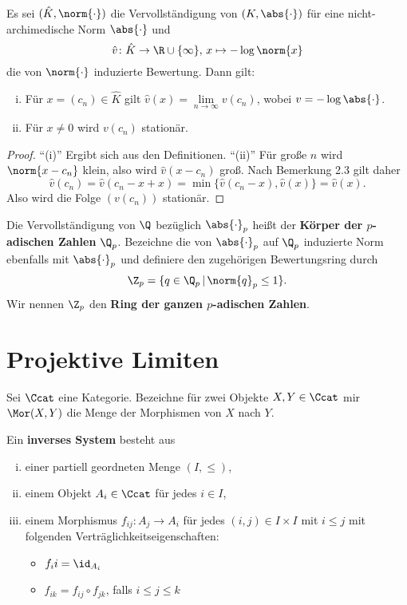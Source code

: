 \begin{Bem}
Es sei $(\hat{K}, \norm{\cdot})$ die Vervollständigung von $(K, \abs{\cdot})$ für eine nicht-archimedische Norm $\abs{\cdot}$ und 
\[ \hat{v} \colon \hat{K} \to \R\cup\{\infty \}, \, x \mapsto - \log \norm{x}
\]
die von $\norm{\cdot}$ induzierte Bewertung. Dann gilt:
\begin{enumerate}[(i)]
\item Für $x=(c_n) \in\hat{K}$ gilt $\hat{v}(x) = \lim\limits_{n\to\infty} v(c_n)$, wobei $v = - \log\abs{\cdot}$.
\item Für $x\neq 0$ wird $v(c_n)$ stationär.
\end{enumerate}
\end{Bem}

\begin{proof}
\enquote{(i)} Ergibt sich aus den Definitionen.
\enquote{(ii)} Für große $n$ wird $\norm{x-c_n}$ klein, also wird $\hat{v}(x-c_n)$ groß.
Nach Bemerkung 2.3 gilt daher
\[ \hat{v}(c_n) = \hat{v}(c_n-x+x) = \min \{ \hat{v}(c_n-x), \hat{v}(x) \} = \hat{v}(x).
\]
Also wird die Folge $(v(c_n))$ stationär.
\end{proof}


\begin{defi}
Die Vervollständigung von $\Q$ bezüglich $\abs{\cdot}_p$ heißt der \textbf{Körper der $p$-adischen Zahlen} $\Q_p$. Bezeichne die von $\abs{\cdot}_p$ auf $\Q_p$ induzierte Norm ebenfalls mit 
$\abs{\cdot}_p$ und definiere den zugehörigen Bewertungsring durch
\[ \Z_p = \{  q \in \Q_p \,|\, \norm{q}_p \leq 1 \}.
\]
Wir nennen $\Z_p$ den \textbf{Ring der ganzen $p$-adischen Zahlen}.
\end{defi}


\section{Projektive Limiten}
Sei $\Ccat$ eine Kategorie. Bezeichne für zwei Objekte $X, Y \in \Ccat$ mir $\Mor(X,Y)$ die Menge der Morphismen von $X$ nach $Y$.

\begin{defi}
Ein \textbf{inverses System} besteht aus
\begin{enumerate}[(i)]
\item einer partiell geordneten Menge $(I,\leq)$,
\item einem Objekt $A_i\in\Ccat$ für jedes $i\in I$,
\item einem Morphismus $f_{ij} \colon A_j \to A_i$ für jedes $(i,j) \in I \times I$ mit $i\leq j$ mit folgenden Verträglichkeitseigenschaften:
\begin{itemize}
\item $f_ii = \id_{A_i}$
\item $f_{ik} = f_{ij} \circ f_{jk}$, falls $i \leq j \leq k$
\end{itemize}
\end{enumerate}
\end{defi}


